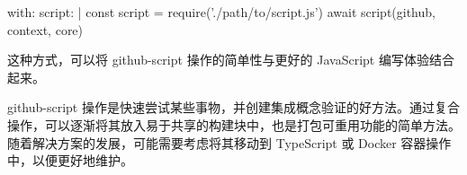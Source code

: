 \begin{shell}
with:
  script: |
    const script = require('./path/to/script.js')
    await script({github, context, core})
\end{shell}

这种方式，可以将 github-script 操作的简单性与更好的 JavaScript 编写体验结合起来。

github-script 操作是快速尝试某些事物，并创建集成概念验证的好方法。通过复合操作，可以逐渐将其放入易于共享的构建块中，也是打包可重用功能的简单方法。随着解决方案的发展，可能需要考虑将其移动到 TypeScript 或 Docker 容器操作中，以便更好地维护。











